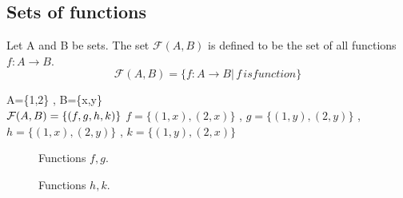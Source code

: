 \documentclass[a4paper,english,12pt]{article}   	%
\begin{document}
\subsection{Sets of functions}
\begin{defn} Let A and B be sets. The set $\mathcal{F}(A,B)$ is defined to be the set of all functions $f \colon A \to B$.
\[ \mathcal{F}(A,B) = \{f \colon A \to B |\, f \,is function \} \]
\end{defn}
\begin{exmp} A=\{1,2\} , B=\{x,y\} \\
$\mathcal{F}(A,B) = \{ (f,g,h,k)\}\\$
$f=\{(1,x),(2,x)\}$ , $g=\{(1,y),(2,y)\}$ , $h=\{(1,x),(2,y)\}$ , $k=\{(1,y),(2,x)\}$
\end{exmp}
\begin{figure}[hhh]
\centering
\scalebox{.8}{ }
\caption{Functions $f,g$.}
\label{Fig:fg}
\end{figure}
\begin{figure}[hhh]
\centering
\scalebox{.8}{ }
\caption{Functions $h,k$.}
\label{Fig:hk}
\end{figure}
\end{document}
